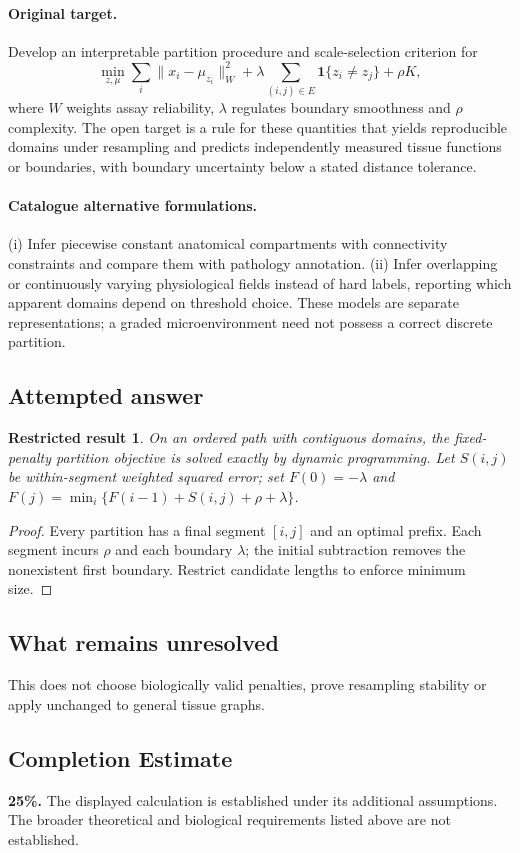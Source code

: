 \documentclass[11pt]{article}
\newtheorem{attemptresult}{Restricted result}[section]
\begin{document}
\paragraph{Original target.}
Develop an interpretable partition procedure and scale-selection criterion for
\[\min_{z,\mu}\sum_i\|x_i-\mu_{z_i}\|_{W}^2+\lambda\sum_{(i,j)\in E}\mathbf1\{z_i\ne z_j\}+\rho K,\]
where $W$ weights assay reliability, $\lambda$ regulates boundary smoothness and $\rho$ complexity. The open target is a rule for these quantities that yields reproducible domains under resampling and predicts independently measured tissue functions or boundaries, with boundary uncertainty below a stated distance tolerance.
\paragraph{Catalogue alternative formulations.}
(i) Infer piecewise constant anatomical compartments with connectivity constraints and compare them with pathology annotation. (ii) Infer overlapping or continuously varying physiological fields instead of hard labels, reporting which apparent domains depend on threshold choice. These models are separate representations; a graded microenvironment need not possess a correct discrete partition.
\subsection{Attempted answer}
\begin{attemptresult}
On an ordered path with contiguous domains, the fixed-penalty partition objective is solved exactly by dynamic programming. Let $S(i,j)$ be within-segment weighted squared error; set $F(0)=-\lambda$ and $F(j)=\min_i\{F(i-1)+S(i,j)+\rho+\lambda\}$.
\end{attemptresult}
\begin{proof}
Every partition has a final segment $[i,j]$ and an optimal prefix. Each segment incurs $\rho$ and each boundary $\lambda$; the initial subtraction removes the nonexistent first boundary. Restrict candidate lengths to enforce minimum size.
\end{proof}
\subsection{What remains unresolved}
This does not choose biologically valid penalties, prove resampling stability or apply unchanged to general tissue graphs.
\subsection{Completion Estimate}
\textbf{25\%.} The displayed calculation is established under its additional assumptions. The broader theoretical and biological requirements listed above are not established.
\end{document}
